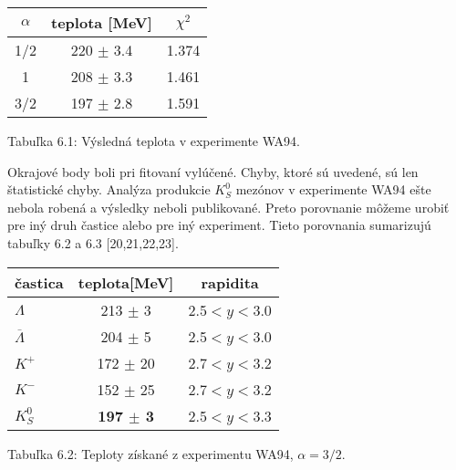 \begin{center}
  \begin{tabular}{|c|c|c|}
    \hline
    $\alpha$ & teplota [MeV] & $\chi^{2}$ \\
    \hline
    1/2 & 220 $\pm$ 3.4 & 1.374 \\ \hline
    1 & 208 $\pm$ 3.3 & 1.461 \\ \hline
    3/2 & 197 $\pm$ 2.8 & 1.591 \\ \hline

  \end{tabular}
\end{center}
\begin{center}
  Tabuľka 6.1: Výsledná teplota v experimente WA94.
\end{center}



Okrajové body boli pri fitovaní vylúčené.  Chyby, ktoré sú uvedené, sú len
štatistické chyby. Analýza produkcie   $K^{0}_{S}$ mezónov v experimente WA94
ešte nebola robená a výsledky neboli publikované. Preto porovnanie môžeme
urobiť pre iný druh častice alebo pre iný experiment. Tieto porovnania
sumarizujú tabuľky 6.2 a 6.3 [20,21,22,23].

\newpage
\begin{center}
  \shorthandoff{-}   %
  \begin{tabular}{|l|c|c|}
    \hline
    častica & teplota[MeV] & rapidita  \\
    \hline \hline
    $\Lambda$ & 213 $\pm$ 3 & 2.5$<y<$3.0  \\ \cline{2-3}
    $\overline{\Lambda}$ & 204 $\pm$ 5  & 2.5$<y<$3.0 \\ \cline{2-3}
    $K^{+}$ & 172 $\pm$ 20 & 2.7$<y<$3.2 \\ \cline{2-3}
    $K^{-}$ & 152 $\pm$ 25 & 2.7$<y<$3.2 \\ \cline{2-3}
    $K^{0}_{S}$ & {\bf 197  ${\pm}$   3} & 2.5$<y<$3.3 \\
    \hline

  \end{tabular}
\end{center}
\begin{center}
  Tabuľka 6.2: Teploty získané z experimentu WA94, $\alpha=3/2$.
\end{center}

